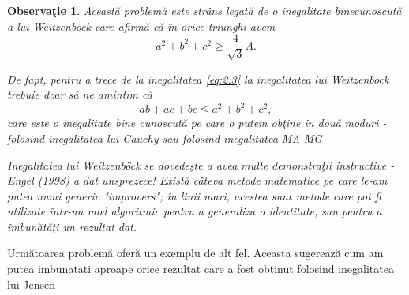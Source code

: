 \documentclass[a4paper,12pt,oneside]{report}
\newtheorem{remark}{Observa\c{t}ie}
\begin{document}
\begin{remark}
Aceast\u{a} problem\u{a} este str\^{a}ns legat\u{a} de o inegalitate binecunoscut\u{a} a lui Weitzenböck care afirm\u{a} c\u{a} \^{i}n orice triunghi avem
\begin{displaymath}
  a^{2} + b^{2} + c^{2} \geq \frac{4}{\sqrt{3}}A. \label{eq:2.4} \tag{2.4}
\end{displaymath}

De fapt, pentru a trece de la inegalitatea \ref{eq:2.3} la inegalitatea lui Weitzenböck trebuie doar s\u{a} ne amintim c\u{a}
\begin{displaymath}
  ab + ac + bc \leq a^{2} + b^{2} + c^{2},
\end{displaymath}
care este o inegalitate bine cunoscut\u{a} pe care o putem ob\c{t}ine \^{i}n dou\u{a} moduri  - folosind inegalitatea lui Cauchy sau folosind inegalitatea MA-MG

	Inegalitatea lui Weitzenböck se dovede\c{s}te a avea multe demonstra\c{t}ii instructive - Engel (1998) a dat unsprezece!
Exist\u{a} c\^{a}teva metode matematice pe care le-am putea numi generic "improvers"; \^{i}n linii mari, acestea sunt metode care pot fi utilizate \^{i}ntr-un mod algoritmic pentru a generaliza o identitate, sau pentru a \^{i}mbun\u{a}t\u{a}\c{t}i un rezultat dat.
\end{remark}
Urm\u{a}toarea problem\u{a} ofer\u{a} un exemplu de alt fel. Aceasta sugereaz\u{a} cum am putea imbunatati aproape orice rezultat care a fost obtinut folosind inegalitatea lui Jensen
\end{document}
